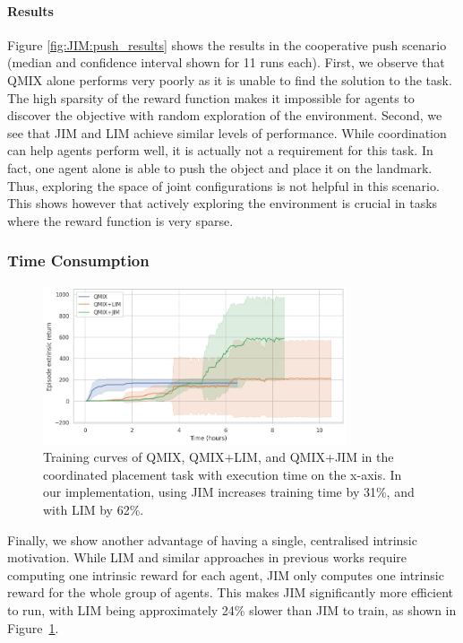 \paragraph{Results} Figure \ref{fig:JIM:push_results} shows the results in the cooperative push scenario (median and confidence interval shown for 11 runs each). First, we observe that QMIX alone performs very poorly as it is unable to find the solution to the task. The high sparsity of the reward function makes it impossible for agents to discover the objective with random exploration of the environment. Second, we see that JIM and LIM achieve similar levels of performance. While coordination can help agents perform well, it is actually not a requirement for this task. In fact, one agent alone is able to push the object and place it on the landmark. Thus, exploring the space of joint configurations is not helpful in this scenario. This shows however that actively exploring the environment is crucial in tasks where the reward function is very sparse. 




\subsubsection{Time Consumption}

\begin{figure}
    \centering
    \includegraphics[width=0.8\textwidth]{Figures/JIM/time.png}
    \caption{Training curves of QMIX, QMIX+LIM, and QMIX+JIM in the coordinated placement task with execution time on the x-axis. In our implementation, using JIM increases training time by 31\%, and with LIM by 62\%.}
    \label{fig:JIM:time}
\end{figure}

Finally, we show another advantage of having a single, centralised intrinsic motivation. While LIM and similar approaches in previous works \citep{Iqbal2019_MultiExplore,Du2019_LIIR,Wang2020_EITI} require computing one intrinsic reward for each agent, JIM only computes one intrinsic reward for the whole group of agents. This makes JIM significantly more efficient to run, with LIM being approximately 24\% slower than JIM to train, as shown in Figure~\ref{fig:JIM:time}. 










